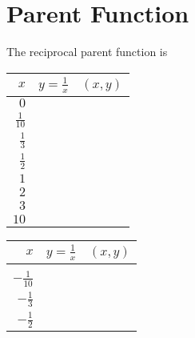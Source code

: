 \section{Parent Function}

The reciprocal parent function is 
\vspace{-0.5\onelineskip}
\myCenteredBox[width=1.75in,valign=center]{
    \large
    \vspace{-1.2em}
    \[ f(x) = \frac{1}{x} \]
}

{
\renewcommand{\arraystretch}{1.5}
\begin{tcbraster}[
    raster columns = 3,
    raster equal height,
    colback=white,
    ]
    \begin{tcolorbox}
        \small
        \begin{tabular}{r|p{0.5in}|c}
            $x$ 
                & $y = \frac{1}{x}$    
                & $(x,y)$\\ \hline\hline
            $0$ 
                &      
                & \\ \hline
            $\frac{1}{10}$ 
                & 
                & \\ \hline
            $\frac{1}{3}$ 
                & 
                & \\ \hline
            $\frac{1}{2}$ 
                & 
                & \\ \hline
            $1$ 
                & 
                & \\ \hline
            $2$ 
                & 
                & \\ \hline
            $3$ 
                & 
                & \\ \hline
            $10$ 
                & 
                & \\ \hline
        \end{tabular}
    \end{tcolorbox}
    \begin{tcolorbox}
        \small
        \begin{tabular}{r|p{0.5in}|c}
            $x$ 
                & $y = \frac{1}{x}$    
                & $(x,y)$\\ \hline\hline
            &&\\ \hline
            $-\frac{1}{10}$ 
                & 
                & \\ \hline
            $-\frac{1}{3}$ 
                & 
                & \\ \hline
            $-\frac{1}{2}$ 
                & 

\end{tabular}
\end{tcolorbox}
\end{tcbraster}}
